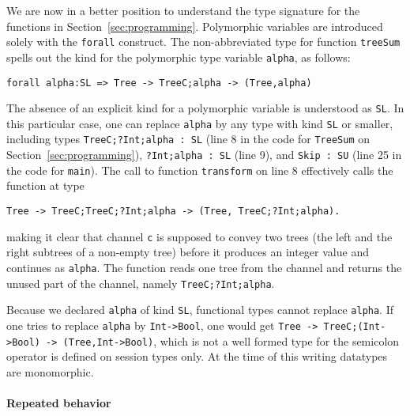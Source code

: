 We are now in a better position to understand the type signature for
the functions in Section~\ref{sec:programming}.  Polymorphic variables
are introduced solely with the \lstinline|forall| construct. The
non-abbreviated type for function \lstinline|treeSum| spells out the
kind for the polymorphic type variable \lstinline|alpha|, as follows:
%
\begin{lstlisting}
forall alpha:SL => Tree -> TreeC;alpha -> (Tree,alpha)
\end{lstlisting}
%
The absence of an explicit kind for a polymorphic variable is
understood as \lstinline|SL|. In this particular case, one can replace
\lstinline|alpha| by any type with kind \lstinline|SL| or smaller,
including types \lstinline|TreeC;?Int;alpha : SL| (line 8 in the code
for \lstinline|TreeSum| on Section~\ref{sec:programming}),
\lstinline|?Int;alpha : SL| (line 9), and \lstinline|Skip : SU| (line
25 in the code for \lstinline|main|).
%
The call to function \lstinline|transform| on line
8 effectively calls the function at type
%
\begin{lstlisting}
Tree -> TreeC;TreeC;?Int;alpha -> (Tree, TreeC;?Int;alpha).
\end{lstlisting}
%
making it clear that channel \lstinline|c| is supposed to convey two
trees (the left and the right subtrees of a non-empty tree) before it
produces an integer value and continues as \lstinline|alpha|. The function reads one tree from the
channel and returns the unused part of the channel, namely
\lstinline|TreeC;?Int;alpha|.

Because we declared \lstinline|alpha| of kind \lstinline|SL|,
functional types cannot replace \lstinline|alpha|.  If one tries to
replace \lstinline|alpha| by \lstinline|Int->Bool|, one would get
%
\lstinline|Tree -> TreeC;(Int->Bool) -> (Tree,Int->Bool)|, which is
not a well formed type for the semicolon operator is defined on
session types only.
%
At the time of this writing datatypes are monomorphic.

\paragraph{Repeated behavior}

